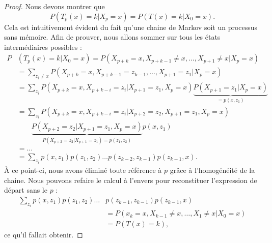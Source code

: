 \begin{proof}
	Nous devons montrer que
	\begin{equation}
		P(T_p(x)=k|X_p=x)=P(T(x)=k|X_0=x).
	\end{equation}
	Cela est intuitivement évident du fait qu'une chaine de Markov soit un processus sans mémoire. Afin de prouver, nous allons sommer sur tous les états intermédiaires possibles :
	\begin{subequations}
		\begin{align}
			P & (T_p(x)=k|X_0=x)=P(X_{p+k}=x,X_{p+k-1}\neq x,\ldots,X_{p+1}\neq x|X_p=x)                             \\
			  & =\sum_{z_i\neq x}P(X_{p+k}=x,X_{p+k-1}=z_{k-1},\ldots,X_{p+1}=z_1|X_p=x)                             \\
			  & =\sum_{z_i}P(X_{p+k}=x,X_{p+k-i}=z_i|X_{p+1}=z_1,X_p=x)\underbrace{P(X_{p+1}=z_1|X_p=x)}_{=p(x,z_1)} \\
			  & =\sum_{z_i}P(X_{p+k}=x,X_{p+k-i}=z_i|X_{p+2}=z_2,X_{p+1}=z_1,X_p=x)                                  \\
			  & \qquad\underbrace{P(X_{p+2}=z_2|X_{p+1}=z_1,X_p=x)}_{P(X_{p+2}=z_2|X_{p+1}=z_1)=p(z_1,z_2)}p(x,z_1)  \\
			  & =\ldots                                                                                              \\
			  & =\sum_{z_i}p(x,z_1)p(z_1,z_2)\ldots p(z_{k-2},z_{k-1})p(z_{k-1},x).
		\end{align}
	\end{subequations}
	À ce point-ci, nous avons éliminé toute référence à \( p\) grâce à l'homogénéité de la chaine. Nous pouvons refaire le calcul à l'envers pour reconstituer l'expression de départ sans le \( p\) :
	\begin{subequations}
		\begin{align}
			\sum_{z_i}p(x,z_1)p(z_1,z_2)\ldots & p(z_{k-1},z_{k-1})p(z_{k-1},x)                 \\
			                                   & =P(x_k=x,X_{k-1}\neq x,\ldots,X_1\neq x|X_0=x) \\
			                                   & =P(T(x)=k),
		\end{align}
	\end{subequations}
	ce qu'il fallait obtenir.
\end{proof}

